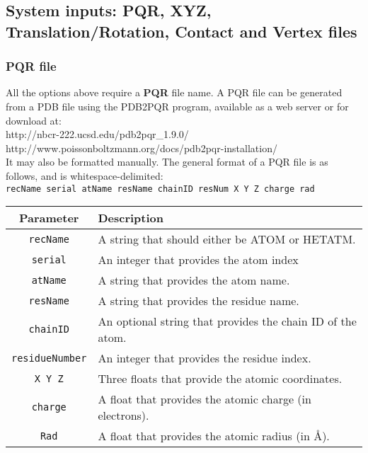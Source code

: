 \clearpage

\subsection{System inputs: PQR, XYZ, Translation/Rotation, Contact and Vertex files }


\subsubsection{PQR file}
All the options above require a \textbf{PQR} file name. A PQR file can be generated from a PDB file using the PDB2PQR program, available as a web server or for download at: \\

http://nbcr-222.ucsd.edu/pdb2pqr\_1.9.0/  \\
http://www.poissonboltzmann.org/docs/pdb2pqr-installation/ \\

It may also be formatted manually. The general format of a PQR file is as follows, and is whitespace-delimited: \\

\texttt{recName  serial  atName  resName  chainID  resNum  X  Y  Z  charge rad }\\

  \begin{tabular}{ c | l  }
    \textbf{Parameter} & \textbf{Description} \\ \hline
\texttt{recName} 	&	A string that should either be ATOM or HETATM. \\
\texttt{serial} 	&	An integer that provides the atom index \\
\texttt{atName} 	&	A string that provides the atom name.\\
\texttt{resName}	&	A string that provides the residue name. \\
\texttt{chainID}	&	An optional string that provides the chain ID of the atom.\\
\texttt{residueNumber}  & An integer that provides the residue index.\\
\texttt{X Y Z}	& Three floats that provide the atomic coordinates.\\
\texttt{charge}	& A float that provides the atomic charge (in electrons). \\
\texttt{Rad}		& A float that provides the atomic radius (in \AA).\\
    \hline
  \end{tabular}

